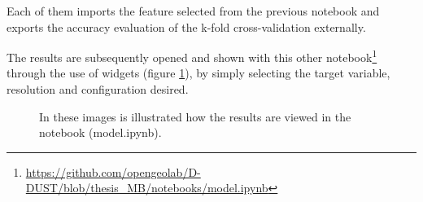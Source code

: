 Each of them imports the feature selected from the previous notebook and exports the accuracy evaluation of the k-fold cross-validation externally. \par
The results are subsequently opened and shown with
this other notebook\footnote{\url{https://github.com/opengeolab/D-DUST/blob/thesis_MB/notebooks/model.ipynb}} through the use of widgets (figure \ref{fig:view}), by simply selecting the target variable, resolution and configuration desired.
\begin{figure}[H] 
    \centering
    \hfill%
    \caption{In these images is illustrated how the results are viewed in the notebook (model.ipynb).}
    \label{fig:view}
\end{figure}

